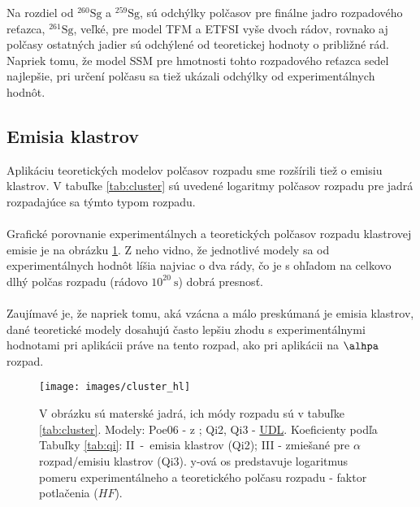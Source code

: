 \documentclass[12pt, oneside]{book}
\begin{document}
Na rozdiel od $^{260} \mathrm{Sg}$ a $^{259} \mathrm{Sg}$, sú odchýlky polčasov pre finálne jadro rozpadového reťazca, $^{261} \mathrm{Sg}$, veľké, pre model TFM a ETFSI vyše dvoch rádov, rovnako aj polčasy ostatných jadier sú odchýlené od teoretickej hodnoty o približné rád. Napriek tomu, že model SSM pre hmotnosti tohto rozpadového reťazca sedel najlepšie, pri určení polčasu sa tiež ukázali odchýlky od experimentálnych hodnôt.

\subsection{Emisia klastrov}
Aplikáciu teoretických modelov polčasov rozpadu sme rozšírili tiež o emisiu klastrov. V tabuľke \ref{tab:cluster} sú uvedené logaritmy polčasov rozpadu pre jadrá rozpadajúce sa týmto typom rozpadu. 
\\
\\
Grafické porovnanie experimentálnych a teoretických polčasov rozpadu klastrovej emisie je na obrázku \ref{fig:cluster_hl}. Z neho vidno, že jednotlivé modely sa od experimentálnych hodnôt líšia  najviac o dva rády, čo je s ohľadom na celkovo dlhý polčas rozpadu (rádovo $10^{20}~\mathrm{s}$) dobrá presnosť. 
\\
\\
Zaujímavé je, že napriek tomu, aká vzácna a málo preskúmaná je emisia klastrov, dané teoretické modely dosahujú často lepšiu zhodu s experimentálnymi hodnotami pri aplikácii práve na tento rozpad, ako pri aplikácii na $\alhpa$ rozpad.


\begin{figure}[h!]
	\begin{center}
	\texttt{[image: images/cluster\_hl]}
	\caption{V obrázku sú materské jadrá, ich módy rozpadu sú v tabuľke \ref{tab:cluster}. Modely: Poe06 - z \cite{poe06}; Qi2, Qi3 - \hyperref[sec:qi_udl]{UDL}. Koeficienty podľa  Tabuľky \ref{tab:qi}: II~-~emisia klastrov (Qi2); III - zmiešané pre $\alpha$ rozpad/emisiu klastrov (Qi3). y-ová os predstavuje logaritmus pomeru experimentálneho a teoretického polčasu rozpadu - faktor potlačenia ($HF$).}
	\label{fig:cluster_hl}
    \end{center}
\end{figure}
\end{document}
